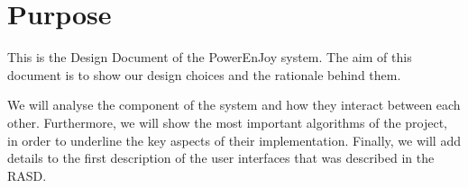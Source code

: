 \section{Purpose}
This is the Design Document of the PowerEnJoy system. The aim of this
document is to show our design choices and the rationale behind them. 

We will analyse the component of the system and how they interact between each other.
Furthermore, we will show the most important algorithms of the project, in order to underline the key aspects of their implementation.
Finally, we will add details to the first description of the user interfaces that was described in the RASD.
